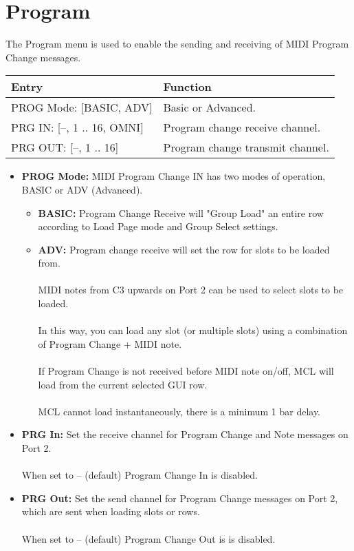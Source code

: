 \section{Program}
The Program menu is used to enable the sending and receiving of MIDI Program Change messages.
\\
\begin{tabular}{|l|l|}
\hline
\rowcolor[HTML]{C0C0C0} 
Entry                                  & Function                                                                       \\ \hline
PROG Mode: {[}BASIC, ADV{]}                & Basic or Advanced. 
\\ \hline
PRG IN: {[}--, 1 .. 16, OMNI{]}            & Program change receive channel.                                            \\ \hline
PRG OUT: {[}--, 1 .. 16{]}          & Program change transmit channel.                                          \\ \hline
\end{tabular}
\begin{itemize}
    \item{\textbf{PROG Mode:} MIDI Program Change IN has two modes of operation, BASIC or ADV (Advanced).
\begin{itemize}
    \item{ \textbf{BASIC:} Program Change Receive will "Group Load" an entire row according to Load Page mode and Group Select settings. }
    \item{  \textbf{ADV:} Program change receive will set the row for slots to be loaded from.\\\\ MIDI notes from C3 upwards on Port 2 can be used to select slots to be loaded.\\\\  In this way, you can load any slot (or multiple slots) using a combination of Program Change + MIDI note. \\\\
 If Program Change is not received before MIDI note on/off, MCL will load from the current selected GUI row.\\\\ 
 MCL cannot load instantaneously, there is a minimum 1 bar delay.}
\end{itemize}}
\item{\textbf{PRG In:}
Set the receive channel for Program Change and Note messages on Port 2.\\\\
When set to -- (default) Program Change In is disabled.}
\item{\textbf{PRG Out:}
Set the send channel for Program Change messages on Port 2, which are sent when loading slots or rows.\\\\
When set to -- (default) Program Change Out is is disabled.}
\end{itemize}

